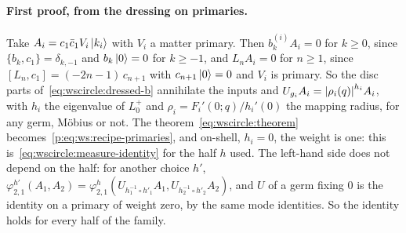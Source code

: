 \paragraph{First proof, from the dressing on primaries.}
Take $A_i = c_1 \bar c_1 V_i \ket{k_i}$ with $V_i$ a matter primary.
Then $b_k^{(i)} A_i = 0$ for $k \geq 0$, since $\{ b_k, c_1 \} = \delta_{k, -1}$ and $b_k \ket{0} = 0$ for $k \geq - 1$, and $L_n A_i = 0$ for $n \geq 1$, since $[L_n, c_1] = (- 2 n - 1) \, c_{n + 1}$ with $c_{n + 1} \ket{0} = 0$ and $V_i$ is primary.
So the disc parts of~\eqref{eq:wscircle:dressed-b} annihilate the inputs and $U_{g_i} A_i = {|\rho_i(q)|}^{h_i} A_i$, with $h_i$ the eigenvalue of $L_0^+$ and $\rho_i = F_i'(0; q) / h_i'(0)$ the mapping radius, for any germ, Möbius or not.
The theorem~\eqref{eq:wscircle:theorem} becomes~\eqref{p:eq:ws:recipe-primaries}, and on-shell, $h_i = 0$, the weight is one: this is~\eqref{eq:wscircle:measure-identity} for the half $h$ used.
The left-hand side does not depend on the half: for another choice $h'$, $\varphi^{h'}_{2,1}(A_1, A_2) = \varphi^h_{2,1}(U_{h_1^{-1} \circ h'_1} A_1, U_{h_2^{-1} \circ h'_2} A_2)$, and $U$ of a germ fixing $0$ is the identity on a primary of weight zero, by the same mode identities.
So the identity holds for every half of the family.

